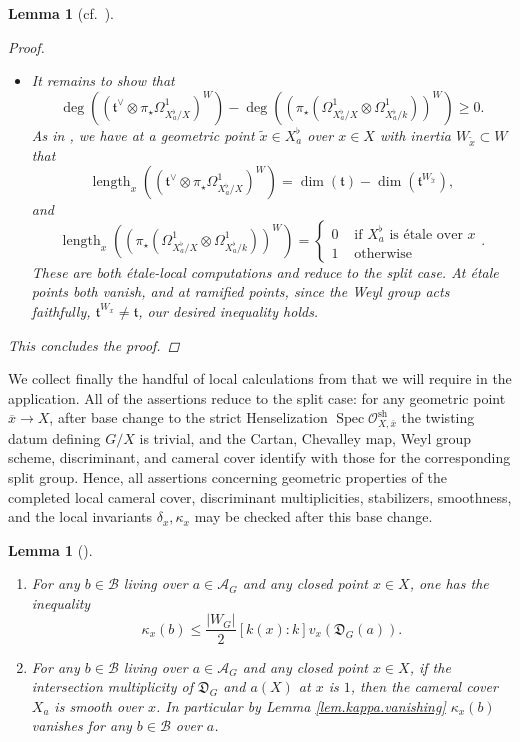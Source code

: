 \documentclass[openany]{amsbook}
\newtheorem{lemma}[theorem]{Lemma}
\theoremstyle{definition}
\theoremstyle{remark}
\numberwithin{equation}{section}
\renewcommand{\O}{\mathcal{O}}
\newcommand{\cA}{\mathcal{A}}
\newcommand{\cB}{\mathcal{B}}
\newcommand{\ol}[1]{\overline{#1}}
\renewcommand{\-}{\operatorname{-}}
\newcommand{\sh}{\operatorname{sh}}
\newcommand{\Spec}{\operatorname{Spec}}
\newcommand{\on}[1]{\operatorname{#1}}
\newcommand{\wtilde}[1]{\widetilde{#1}}
\newcommand{\ft}{\mathfrak{t}}
\newcommand{\fD}{\mathfrak{D}}
\begin{document}
\begin{lemma}[{cf.\ \cite[Lemme 9.9.1]{CLII}}]
\begin{proof}
\begin{itemize}
            \item It remains to show that 
            $$
                \deg((\ft^\vee \otimes \pi_\star \Omega^1_{X^\flat_a/X})^W) - \deg ((\pi_\star(\Omega^1_{X_a^\flat/X} \otimes \Omega^1_{X^\flat_a/k}))^W) \ge 0.
            $$
            As in \cite[Lemme 9.11.1(3)-(4)]{CLII}, we have at a geometric point $\wtilde{x} \in X_a^\flat$ over $x \in X$ with inertia $W_{\wtilde{x}} \subset W$ that
            $$
                \on{length}_x((\ft^\vee \otimes \pi_\star \Omega^1_{X^\flat_a/X})^W) = \dim(\ft) - \dim(\ft^{W_{\wtilde{x}}}),
            $$
            and
            $$
                \on{length}_x((\pi_\star(\Omega^1_{X_a^\flat/X} \otimes \Omega^1_{X^\flat_a/k}))^W) = \begin{cases}
                    0 &\text{ if $X_a^\flat$ is \'etale over $x$}\\
                    1 &\text{ otherwise}
                \end{cases}.
            $$
            These are both \'etale-local computations and reduce to the split case. At \'etale points both vanish, and at ramified points, since the Weyl group acts faithfully, $\ft^{W_x} \neq \ft$, our desired inequality holds.
        \end{itemize}
        This concludes the proof.
    \end{proof}
\end{lemma}

We collect finally the handful of local calculations from \cite{CLII} that we will require in the application. All of the assertions reduce to the split case: for any geometric point $\ol{x} \to X$, after base change to the strict Henselization $\Spec \O^{\sh}_{X, \ol{x}}$ the twisting datum defining $G/X$ is trivial, and the Cartan, Chevalley map, Weyl group scheme, discriminant, and cameral cover identify with those for the corresponding split group. Hence, all assertions concerning geometric properties of the completed local cameral cover, discriminant multiplicities, stabilizers, smoothness, and the local invariants $\delta_x, \kappa_x$ may be checked after this base change.

\begin{lemma}[{\cite[Lemmes 9.13.2, 9.14.1]{CLII}}]\label{lem.kappa.local.computations}
\noindent
    \begin{enumerate} 
    \item For any $b \in \cB$ living over $a \in \cA_G$ and any closed point $x \in X$, one has the inequality
    $$
        \kappa_x(b) \le \frac{|W_G|}{2} [k(x) : k] v_x(\fD_G(a)).
    $$
    \item For any $b \in \cB$ living over $a \in \cA_G$ and any closed point $x \in X$, if the intersection multiplicity of $\fD_G$ and $a(X)$ at $x$ is $1$, then the cameral cover $X_a$ is smooth over $x$. In particular by Lemma \ref{lem.kappa.vanishing} $\kappa_x(b)$ vanishes for any $b \in \cB$ over $a$.
    \end{enumerate}
\end{lemma}
\end{document}
